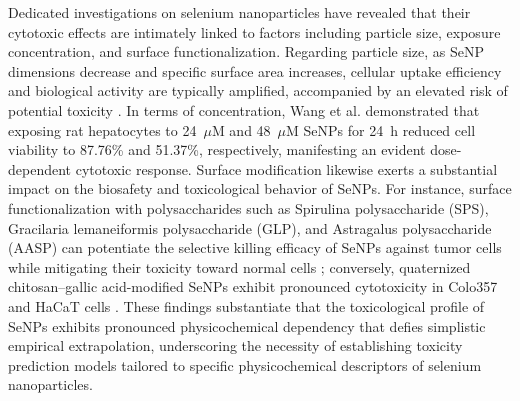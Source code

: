 Dedicated investigations on selenium nanoparticles have revealed that their cytotoxic effects are intimately linked to factors including particle size, exposure concentration, and surface functionalization. Regarding particle size, as SeNP dimensions decrease and specific surface area increases, cellular uptake efficiency and biological activity are typically amplified, accompanied by an elevated risk of potential toxicity \cite{zhang2023senpsbio}. In terms of concentration, Wang et al. \cite{wang2020prooxidation} demonstrated that exposing rat hepatocytes to 24~$\mu$M and 48~$\mu$M SeNPs for 24~h reduced cell viability to 87.76\% and 51.37\%, respectively, manifesting an evident dose-dependent cytotoxic response. Surface modification likewise exerts a substantial impact on the biosafety and toxicological behavior of SeNPs. For instance, surface functionalization with polysaccharides such as Spirulina polysaccharide (SPS), Gracilaria lemaneiformis polysaccharide (GLP), and Astragalus polysaccharide (AASP) can potentiate the selective killing efficacy of SeNPs against tumor cells while mitigating their toxicity toward normal cells \cite{zhang2023senpsbio,ji2023astragalus}; conversely, quaternized chitosan--gallic acid-modified SeNPs exhibit pronounced cytotoxicity in Colo357 and HaCaT cells \cite{lunkov2023chitosan}. These findings substantiate that the toxicological profile of SeNPs exhibits pronounced physicochemical dependency that defies simplistic empirical extrapolation, underscoring the necessity of establishing toxicity prediction models tailored to specific physicochemical descriptors of selenium nanoparticles.

